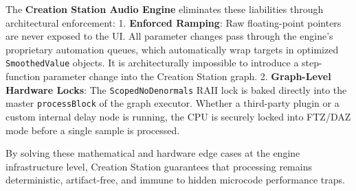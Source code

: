 \documentclass[11pt,a4paper]{article}
\begin{document}
The \textbf{Creation Station Audio Engine} eliminates these liabilities through architectural enforcement:
1. \textbf{Enforced Ramping}: Raw floating-point pointers are never exposed to the UI. All parameter changes pass through the engine's proprietary automation queues, which automatically wrap targets in optimized \texttt{SmoothedValue} objects. It is architecturally impossible to introduce a step-function parameter change into the Creation Station graph.
2. \textbf{Graph-Level Hardware Locks}: The \texttt{ScopedNoDenormals} RAII lock is baked directly into the master \texttt{processBlock} of the graph executor. Whether a third-party plugin or a custom internal delay node is running, the CPU is securely locked into FTZ/DAZ mode before a single sample is processed. 

By solving these mathematical and hardware edge cases at the engine infrastructure level, Creation Station guarantees that processing remains deterministic, artifact-free, and immune to hidden microcode performance traps.
\end{document}
